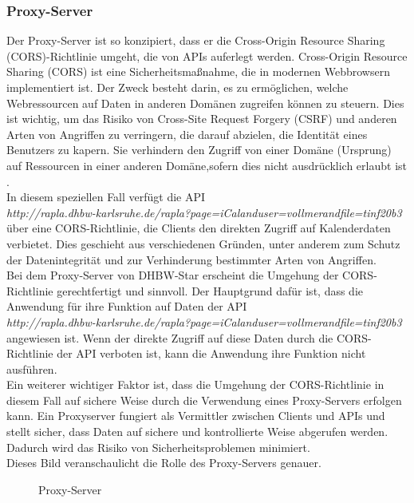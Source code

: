 \subsubsection{Proxy-Server}
Der Proxy-Server ist so konzipiert, dass er die Cross-Origin Resource Sharing (CORS)-Richtlinie umgeht, die von APIs auferlegt werden. Cross-Origin Resource Sharing (CORS) ist eine Sicherheitsmaßnahme, die in modernen Webbrowsern implementiert ist. Der Zweck besteht darin, es zu ermöglichen, welche Webressourcen auf Daten in anderen Domänen zugreifen können zu steuern. Dies ist wichtig, um das Risiko von Cross-Site Request Forgery (CSRF) und anderen Arten von Angriffen zu verringern, die darauf abzielen, die Identität eines Benutzers zu kapern. Sie verhindern den Zugriff von einer Domäne (Ursprung) auf Ressourcen in einer anderen Domäne,sofern dies nicht ausdrücklich erlaubt ist \cite{ionos-de}.\\
In diesem speziellen Fall verfügt die API\\ \emph{http://rapla.dhbw-karlsruhe.de/rapla?page=iCalanduser=vollmerandfile=tinf20b3} über eine CORS-Richtlinie, die Clients den direkten Zugriff auf Kalenderdaten verbietet. Dies geschieht aus verschiedenen Gründen, unter anderem zum Schutz der Datenintegrität und zur Verhinderung bestimmter Arten von Angriffen\cite{crashtest-security-com}.\\
Bei dem Proxy-Server von DHBW-Star erscheint die Umgehung der CORS-Richtlinie gerechtfertigt und sinnvoll. Der Hauptgrund dafür ist, dass die Anwendung für ihre Funktion auf Daten der API\\ \emph{http://rapla.dhbw-karlsruhe.de/rapla?page=iCalanduser=vollmerandfile=tinf20b3} angewiesen ist. Wenn der direkte Zugriff auf diese Daten durch die CORS-Richtlinie der API verboten ist, kann die Anwendung  ihre Funktion nicht ausführen.\\
Ein weiterer wichtiger Faktor ist, dass die Umgehung der CORS-Richtlinie in diesem Fall auf sichere Weise durch die Verwendung eines Proxy-Servers erfolgen kann. Ein Proxyserver fungiert als Vermittler zwischen Clients und APIs und stellt sicher, dass  Daten auf sichere und kontrollierte Weise abgerufen werden. Dadurch wird das Risiko von Sicherheitsproblemen minimiert.\\
Dieses Bild veranschaulicht die Rolle des Proxy-Servers genauer.\\
\begin{figure}[htbp]
	\centering
	\caption{Proxy-Server}
\end{figure}

